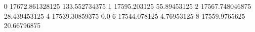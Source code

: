 0 17672.861328125 133.552734375
1 17595.203125 55.89453125
2 17567.748046875 28.439453125
4 17539.30859375 0.0
6 17544.078125 4.76953125
8 17559.9765625 20.66796875
